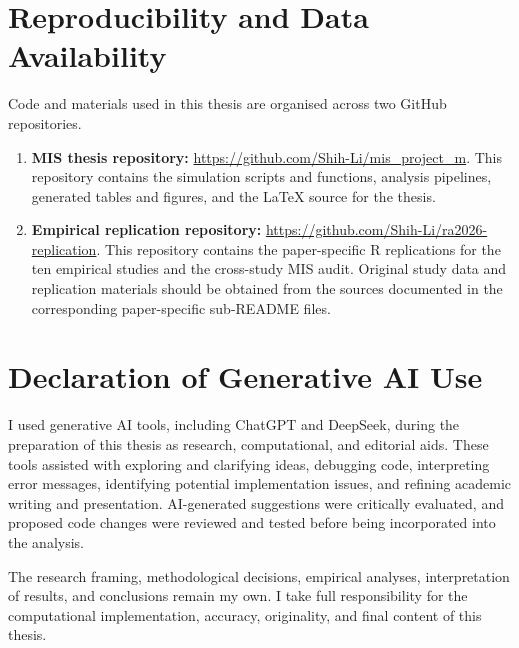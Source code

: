 \documentclass[../main.tex]{subfiles}
\begin{document}
\section{Reproducibility and Data Availability}
\label{app:reproducibility}

Code and materials used in this thesis are organised across two GitHub repositories.

\begin{enumerate}
\item \textbf{MIS thesis repository:}
\url{https://github.com/Shih-Li/mis_project_m}.
This repository contains the simulation scripts and functions, analysis pipelines, generated tables and figures, and the \LaTeX{} source for the thesis.

\item \textbf{Empirical replication repository:}
\url{https://github.com/Shih-Li/ra2026-replication}.
This repository contains the paper-specific R replications for the ten empirical studies and the cross-study MIS audit. Original study data and replication materials should be obtained from the sources documented in the corresponding paper-specific sub-README files.
\end{enumerate}

\section{Declaration of Generative AI Use}

I used generative AI tools, including ChatGPT and DeepSeek, during the preparation of this thesis as research, computational, and editorial aids. These tools assisted with exploring and clarifying ideas, debugging code, interpreting error messages, identifying potential implementation issues, and refining academic writing and presentation. AI-generated suggestions were critically evaluated, and proposed code changes were reviewed and tested before being incorporated into the analysis.

The research framing, methodological decisions, empirical analyses, interpretation of results, and conclusions remain my own. I take full responsibility for the computational implementation, accuracy, originality, and final content of this thesis.
\end{document}
